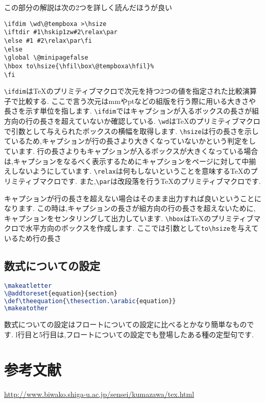 この部分の解説は次の2つを詳しく読んだほうが良い
\begin{verbatim}
\ifdim \wd\@tempboxa >\hsize
\iftdir #1\hskip1zw#2\relax\par
\else #1 #2\relax\par\fi
\else
\global \@minipagefalse
\hbox to\hsize{\hfil\box\@tempboxa\hfil}%
\fi
\end{verbatim}
\verb|\ifdim|は{\TeX}のプリミティブマクロで次元を持つ2つの値を指定された比較演算子で比較する.
ここで言う次元はmmやptなどの組版を行う際に用いる大きさや長さを示す単位を指します.
\verb|\ifdim|ではキャプションが入るボックスの長さが組方向の行の長さを超えていないか確認している.
\verb|\wd|は{\TeX}のプリミティブマクロで引数として与えられたボックスの横幅を取得します.
\verb|\hsize|は行の長さを示しているため,キャプションが行の長さより大きくなっていないかという判定をしています.
行の長さよりもキャプションが入るボックスが大きくなっている場合は,キャプションをなるべく表示するためにキャプションをページに対して中揃えしないようにしています.
\verb|\relax|は何もしないということを意味する{\TeX}のプリミティブマクロです.
また,\verb|\par|は改段落を行う{\TeX}のプリミティブマクロです.

キャプションが行の長さを超えない場合はそのまま出力すれば良いということになります.
この時は,キャプションの長さが組方向の行の長さを超えないために,キャプションをセンタリングして出力しています.
\verb|\hbox|は{\TeX}のプリミティブマクロで水平方向のボックスを作成します.
ここでは引数として\verb|to\hsize|を与えているため行の長さ

\subsection{数式についての設定}
\begin{lstlisting}[caption = 数式まわりの設定, label = list:eq, language = tex]
\makeatletter
\@addtoreset{equation}{section}
\def\theequation{\thesection.\arabic{equation}}
\makeatother
\end{lstlisting}

数式についての設定はフロートについての設定に比べるとかなり簡単なものです.
l行目と5行目は,フロートについての設定でも登場したある種の定型句です.

\section*{参考文献}
\url{http://www.biwako.shiga-u.ac.jp/sensei/kumazawa/tex.html}
